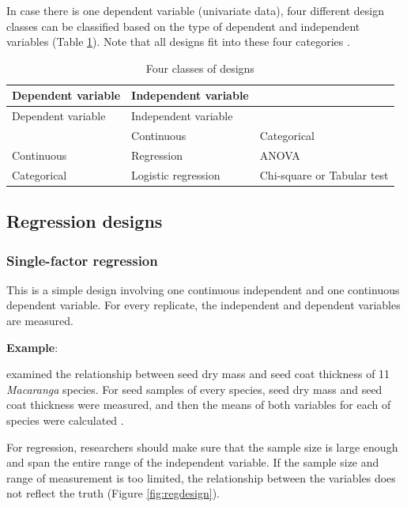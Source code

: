\documentclass[
]{book}
\begin{document}
In case there is one dependent variable (univariate data), four different design classes can be classified based on the type of dependent and independent variables (Table \ref{tab:designclass}). Note that all designs fit into these four categories \citep{gotelli2004}.

\begin{longtable}[]{@{}lll@{}}
\caption{\label{tab:designclass} Four classes of designs}\tabularnewline
\toprule\noalign{}
Dependent variable & Independent variable & \\
\midrule\noalign{}
\endfirsthead
\toprule\noalign{}
Dependent variable & Independent variable & \\
\midrule\noalign{}
\endhead
\bottomrule\noalign{}
\endlastfoot
& Continuous & Categorical \\
Continuous & Regression & ANOVA \\
Categorical & Logistic regression & Chi-square or Tabular test \\
\end{longtable}

\subsection{Regression designs}\label{regression-designs}

\subsubsection{Single-factor regression}\label{single-factor-regression}

This is a simple design involving one continuous independent and one continuous dependent variable. For every replicate, the independent and dependent variables are measured.

\textbf{Example}:

\citet{tiansawat2014} examined the relationship between seed dry mass and seed coat thickness of 11 \emph{Macaranga} species. For seed samples of every species, seed dry mass and seed coat thickness were measured, and then the means of both variables for each of species were calculated \citep{tiansawat2014}.

For regression, researchers should make sure that the sample size is large enough and span the entire range of the independent variable. If the sample size and range of measurement is too limited, the relationship between the variables does not reflect the truth (Figure \ref{fig:regdesign}).
\end{document}
